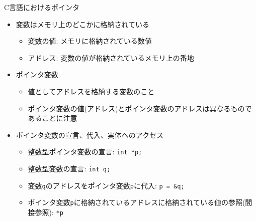 \begin{frame}[t,fragile]{C言語におけるポインタ}
  \begin{itemize}
  \item 変数はメモリ上のどこかに格納されている
    \begin{itemize}
    \item 変数の値: メモリに格納されている数値
    \item アドレス: 変数の値が格納されているメモリ上の番地
    \end{itemize}
  \item ポインタ変数
    \begin{itemize}
    \item 値としてアドレスを格納する変数のこと
    \item ポインタ変数の値(アドレス)とポインタ変数のアドレスは異なるものであることに注意
    \end{itemize}
  \item ポインタ変数の宣言、代入、実体へのアクセス
    \begin{itemize}
    \item 整数型ポインタ変数の宣言: {\color{red} \verb+int *p;+}
    \item 整数型変数の宣言: \verb+int q;+
    \item 変数\verb+q+のアドレスをポインタ変数\verb+p+に代入: {\color{red} \verb+p = &q;+}
    \item ポインタ変数\verb+p+に格納されているアドレスに格納されている値の参照(間接参照): {\color{red} \verb+*p+}
    \end{itemize}
  \end{itemize}
\end{frame}
